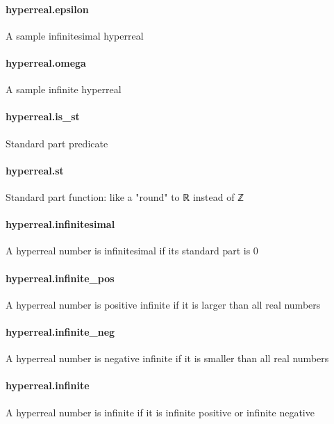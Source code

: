 \documentclass{article}
\begin{document}
\paragraph{hyperreal.epsilon}
\par
A sample infinitesimal hyperreal
\paragraph{hyperreal.omega}
\par
A sample infinite hyperreal
\paragraph{hyperreal.is\_st}
\par
Standard part predicate
\paragraph{hyperreal.st}
\par
Standard part function: like a "round" to ℝ instead of ℤ
\paragraph{hyperreal.infinitesimal}
\par
A hyperreal number is infinitesimal if its standard part is 0
\paragraph{hyperreal.infinite\_pos}
\par
A hyperreal number is positive infinite if it is larger than all real numbers
\paragraph{hyperreal.infinite\_neg}
\par
A hyperreal number is negative infinite if it is smaller than all real numbers
\paragraph{hyperreal.infinite}
\par
A hyperreal number is infinite if it is infinite positive or infinite negative
\end{document}
